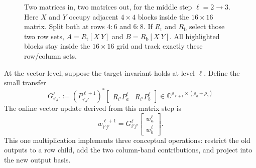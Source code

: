 \documentclass[11pt]{article}
\newcommand{\C}{\mathbb{C}}
\begin{document}
\begin{figure}[htbp]
\caption{Two matrices in, two matrices out, for the middle step $\ell=2\to3$.  Here $X$ and $Y$ occupy adjacent $4\times4$ blocks inside the $16\times16$ matrix.  Split both at rows $4:6$ and $6:8$.  If $R_{\mathrm t}$ and $R_{\mathrm b}$ select those two row sets, $A=R_{\mathrm t}[X\ Y]$ and $B=R_{\mathrm b}[X\ Y]$.  All highlighted blocks stay inside the $16\times16$ grid and track exactly these row/column sets.}
\label{fig:two-two}
\end{figure}

At the vector level, suppose the target invariant holds at level $\ell$.  Define the small transfer
\[
 G_{i'j'}^{\ell}:=(P_{i'j'}^{\ell+1})^*
 \begin{bmatrix}R_{i'}P_a^\ell&R_{i'}P_b^\ell\end{bmatrix}
 \in\C^{\rho_{\ell+1}\times(\rho_a+\rho_b)}
 \tag{11}\label{eq:G-definition}
\]
The online vector update derived from this matrix step is
\[
 \boxed{\quad w_{i'j'}^{\ell+1}=G_{i'j'}^{\ell}
 \begin{bmatrix}w_a^\ell\\w_b^\ell\end{bmatrix}.\quad}
 \tag{12}\label{eq:target-update}
\]
This one multiplication implements three conceptual operations: restrict the old outputs to a row child, add the two column-band contributions, and project into the new output basis.
\end{document}
